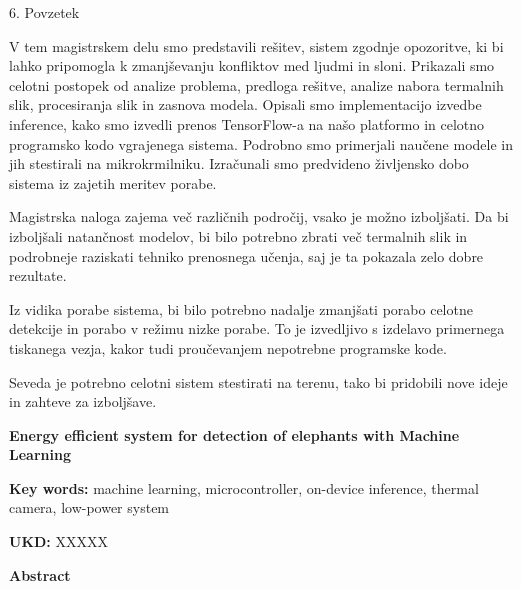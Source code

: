 {6. Povzetek

V tem magistrskem delu smo predstavili rešitev, sistem zgodnje opozoritve, ki bi lahko pripomogla k zmanjševanju konfliktov med ljudmi in sloni.
Prikazali smo celotni postopek od analize problema, predloga rešitve, analize nabora termalnih slik, procesiranja slik in zasnova modela.
Opisali smo implementacijo izvedbe inference, kako smo izvedli prenos TensorFlow-a na našo platformo in celotno programsko kodo vgrajenega sistema.
Podrobno smo primerjali naučene modele in jih stestirali na mikrokrmilniku.
Izračunali smo predvideno življensko dobo sistema iz zajetih meritev porabe.

Magistrska naloga zajema več različnih področij, vsako je možno izboljšati.
Da bi izboljšali natančnost modelov, bi bilo potrebno zbrati več termalnih slik in podrobneje raziskati tehniko prenosnega učenja, saj je ta pokazala zelo dobre rezultate.

Iz vidika porabe sistema, bi bilo potrebno nadalje zmanjšati porabo celotne detekcije in porabo v režimu nizke porabe.
To je izvedljivo s izdelavo primernega tiskanega vezja, kakor tudi proučevanjem nepotrebne programske kode.

Seveda je potrebno celotni sistem stestirati na terenu, tako bi pridobili nove ideje in zahteve za izboljšave.
}
\newpage

\begin{poglavje}
\noindent\bfseries Energy efficient system for detection of elephants with Machine Learning
\end{poglavje}

\bigskip
\bigskip
\bigskip
\bigskip
\bigskip
\textbf{Key words:} machine learning, microcontroller, on-device inference, thermal camera, low-power system

\bigskip
\textbf{UKD:} XXXXX

\bigskip
\bigskip
\bigskip
\bigskip
\textbf{Abstract}

